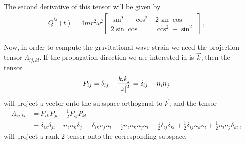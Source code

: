 \documentclass[main.tex]{subfiles}
\begin{document}
The second derivative of this tensor will be given by 
%
\begin{align}
\ddot{Q}^{ij}(t) = 4 m r^2 \omega^2 \left[\begin{array}{cc}
\sin^2 - \cos^2 & 2 \sin \cos \\ 
2 \sin \cos & \cos^2 - \sin^2
\end{array}\right]
\,,
\end{align}
%
 

Now, in order to compute the gravitational wave strain we need the projection tensor \(\Lambda_{ij, kl}\).
If the propagation direction we are interested in is \(\vec{k}\), then the tensor 
%
\begin{align}
P_{ij} = \delta_{ij} - \frac{k_i k_j}{\abs{k}^2} = \delta_{ij} - n_i n_j
\,
\end{align}
%
will project a vector onto the subspace orthogonal to \(\vec{k}\); and the tensor 
%
\begin{align}
\Lambda_{ij, kl} &= P_{ik} P_{jl} - \frac{1}{2} P_{ij} P_{kl}  \\
&= \delta_{ik} \delta_{jl} - n_i n_k \delta_{jl} - \delta_{ik} n_j n_l + \frac{1}{2} n_{i} n_k n_j n_l - \frac{1}{2} \delta_{ij} \delta_{kl} + \frac{1}{2} \delta_{ij} n_k n_l + \frac{1}{2} n_i n_j \delta_{kl} 
\,,
\end{align}
%
will project a rank-2 tensor onto the corresponding subspace. 
\end{document}
